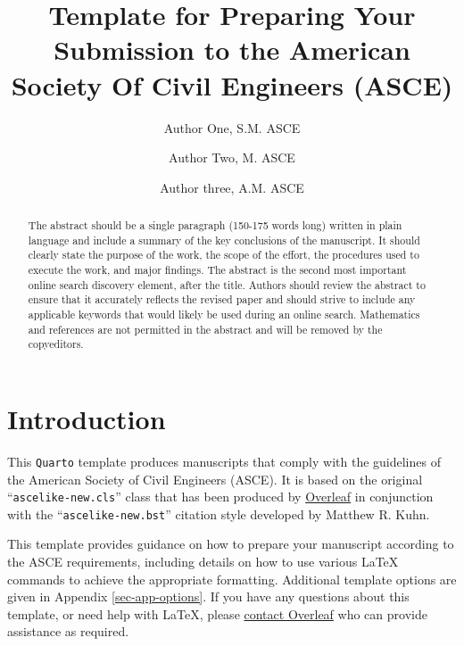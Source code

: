 \documentclass[Journal,LineNumbers]{ascelike-new}
\begin{document}
\title{Template for Preparing Your Submission to the American Society Of
Civil Engineers (ASCE)}

\author[1]{Author One, S.M. ASCE}%
\author[2]{Author Two, M. ASCE}%
\author[3*]{Author three, A.M. ASCE}%

\maketitle

\begin{abstract}
	The abstract should be a single paragraph (150-175 words long) written
in plain language and include a summary of the key conclusions of the
manuscript. It should clearly state the purpose of the work, the scope
of the effort, the procedures used to execute the work, and major
findings. The abstract is the second most important online search
discovery element, after the title. Authors should review the abstract
to ensure that it accurately reflects the revised paper and should
strive to include any applicable keywords that would likely be used
during an online search. Mathematics and references are not permitted in
the abstract and will be removed by the copyeditors.
\end{abstract}



\section{Introduction}\label{introduction}

This \texttt{Quarto} template produces manuscripts that comply with the
guidelines of the American Society of Civil Engineers (ASCE). It is
based on the original ``\texttt{ascelike-new.cls}'' class that has been
produced by \href{https://www.overleaf.com}{Overleaf} in conjunction
with the ``\texttt{ascelike-new.bst}'' citation style developed by
Matthew R. Kuhn.

This template provides guidance on how to prepare your manuscript
according to the ASCE requirements, including details on how to use
various LaTeX commands to achieve the appropriate formatting. Additional
template options are given in Appendix \ref{sec-app-options}. If you
have any questions about this template, or need help with LaTeX, please
\href{https://www.overleaf.com/contact}{contact Overleaf} who can
provide assistance as required.
\end{document}
